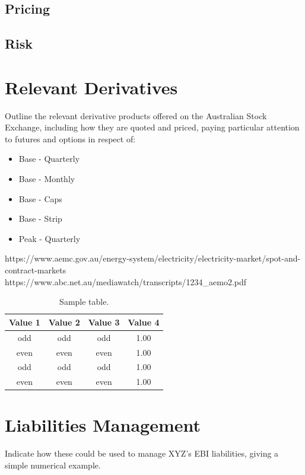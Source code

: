 \documentclass[12pt]{article}
\begin{document}
\lipsum[1]

\subsection{Pricing}
\lipsum[1]

\subsection{Risk}
\lipsum[1]


\section{Relevant Derivatives}
Outline the relevant derivative products offered on the Australian Stock Exchange, including how they are quoted and priced, paying particular attention to futures and options in respect of: 
\begin{itemize}
 \item Base - Quarterly
 \item Base - Monthly
 \item Base - Caps
 \item Base - Strip
 \item Peak - Quarterly
\end{itemize}

\begin{flushleft}
https://www.aemc.gov.au/energy-system/electricity/electricity-market/spot-and-contract-markets
https://www.abc.net.au/mediawatch/transcripts/1234_aemo2.pdf
\end{flushleft}

\begin{table}[!h]
\centering
\caption{Sample table.}
\begin{tabular}{cccc}
\toprule
Value 1 & Value 2 & Value 3 & Value 4\\
\midrule
 odd     & odd   & odd & 1.00 \\
 even    & even  & even& 1.00 \\
 odd     & odd   & odd & 1.00 \\
 even    & even  & even& 1.00 \\
\bottomrule
\end{tabular}
\end{table}

\section{Liabilities Management}
Indicate how these could be used to manage XYZ’s EBI liabilities, giving a simple numerical example. \par
\end{document}
